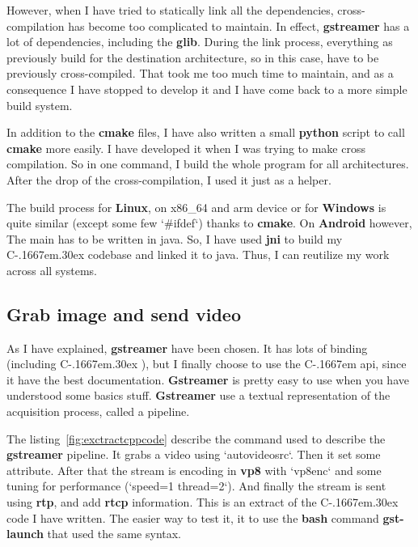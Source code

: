 \documentclass[a4paper,11pt]{custom}
\newcommand{\rtp}{\textbf{rtp}\xspace}
\newcommand{\rtcp}{\textbf{rtcp}\xspace}
\newcommand{\gstreamer}{\textbf{gstreamer}\xspace}
\newcommand{\Gstreamer}{\textbf{Gstreamer}\xspace}
\newcommand{\vpx}{\textbf{vp8}\xspace}
\newcommand{\cmake}{\textbf{cmake}\xspace}
\newcommand{\jni}{\textbf{jni}\xspace}
\newcommand{\bash}{\textbf{bash}\xspace}
\newcommand{\python}{\textbf{python}\xspace}
\newcommand{\command}[1]{\textbf{#1}\xspace}
\newcommand{\linux}{\textbf{Linux}\xspace}
\newcommand{\win}{\textbf{Windows}\xspace}
\newcommand{\android}{\textbf{Android}\xspace}
\newcommand{\cpp}{%
  C\kern-.1667em\raise.30ex\hbox{\smaller{++}\xspace}%
  \spacefactor1000%
}
\newcommand{\clang}{%
  C\kern-.1667em%
  \xspace%
}
\begin{document}
However, when I have tried to statically link all the dependencies,
cross-compilation has become too complicated to maintain. In effect, \gstreamer
has a lot of dependencies, including the \textbf{glib}. During the link process,
everything as previously build for the destination architecture, so in this
case, have to be previously cross-compiled. That took me too much time to
maintain, and as a consequence I have stopped to develop it and I have come
back to a more simple build system.

In addition to the \cmake files, I have also written a small \python script
to call \cmake more easily. I have developed it when I was trying to make
cross compilation. So in one command, I build the whole program for all
architectures. After the drop of the cross-compilation, I used it just as a
helper.

The build process for \linux, on x86_64 and arm device or for \win{} is quite
similar (except some few `\#ifdef`) thanks to \cmake. On \android{} however,
The main has to be written in java. So, I have used \jni{} to build my \cpp{}
codebase and linked it to java. Thus, I can reutilize my work across all systems.

\subsection{Grab image and send video}

As I have explained, \gstreamer have been chosen. It has lots of binding
(including \cpp), but I finally choose to use the \clang api, since it have the
best documentation. \Gstreamer is pretty easy to use when you have understood
some basics stuff. \Gstreamer use a textual representation of the acquisition
process, called a pipeline.

The listing~\ref{fig:exctractcppcode} describe the command used to describe the
\gstreamer pipeline. It grabs a video using `autovideosrc`. Then it set some
attribute. After that the stream is encoding in \vpx with `vp8enc` and some
tuning for performance (`speed=1 thread=2`). And finally the stream is sent
using \rtp, and add \rtcp information. This is an extract of the \cpp code
I have written. The easier way to test it, it to use the \bash command
\command{gst-launch} that used the same syntax.
\end{document}
